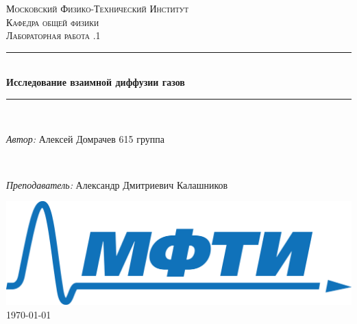 \documentclass[a4paper, 12pt]{article}
\newenvironment{bottompar}{\par\vspace*{\fill}}{\clearpage}
\begin{document}
\begin{titlepage}

\newcommand{\HRule}{\rule{\linewidth}{0.5mm}} %


\center %
 
 
 

\textsc{\LARGE Московский Физико-Технический Институт}\\[1,5cm] %
\textsc{\Large Кафедра общей физики}\\[0.5cm]
\textsc{\large Лабораторная работа .1}\\[0.5cm] %


\HRule
\\[0.4cm]
{ \huge \bfseries Исследование взаимной диффузии газов}
\\[0.2cm] %
\HRule
\\[1.5cm]


 

\begin{minipage}{0.7\textwidth}
	\begin{center} \large
		\emph{Автор:} Алексей \textsf{Домрачев} 615 группа
	\end{center}
\end{minipage}
\\[1.0cm]
\textbf{}\begin{minipage}{0.9\textwidth}
	\begin{center} \large
		\emph{Преподаватель:} Александр Дмитриевич \textsf{Калашников} %
	\end{center}
\end{minipage}

\begin{bottompar}
		\includegraphics[width = 80 mm]{logo.png}	\\[1,0cm]
    {\large \today}
\end{bottompar}
\vfill %

\end{titlepage}
\end{document}
